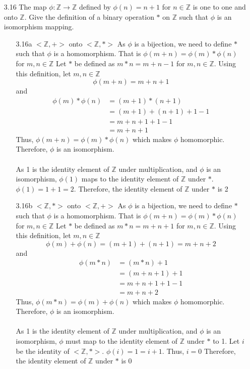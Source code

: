\documentclass[12pt]{article}
\newcommand{\Z}{\mathds{Z}}
\begin{document}
\begin{enumerate}
\begin{enumerate}
			\item[3.16] The map $\phi: \Z \rightarrow \Z$ defined by $\phi (n) = n+1$ for $n \in \Z$ is one to one and onto $\Z$. Give the definition of a binary operation $*$ on $\Z$ such that $\phi$ is an isomorphism mapping.
			\begin{enumerate}
				\item[3.16a]
				$<\Z,+>$ onto $<\Z,\ast>$
				As $ \phi $ is a bijection, we need to define $ * $ such that $ \phi $ is a homomorphism. That is $ \phi(m+n)=\phi(m)*\phi(n) $ for $ m,n \in\Z $
				Let $ * $ be defined as $ m*n = m+n-1$ for $ m,n\in\Z $. Using this definition, let $ m,n\in\Z $
					\[\phi(m + n)=m+n+1\] and
					\begin{align*}
						\phi(m)*\phi(n) &= (m+1)*(n+1)\\
										&= (m+1) + (n+1) + 1 - 1\\
										&= m + n + 1 + 1 -1\\
										&= m+n+1
					\end{align*}
					Thus, $ \phi(m+n)=\phi(m)*\phi(n) $ which makes $ \phi $ homomorphic.\\
					Therefore, $ \phi $ is an isomorphism.\\
					\\
					As 1 is the identity element of $\Z$  under multiplication, and $ \phi $ is an isomorphism, $ \phi(1) $ maps to the identity element of $ \Z $ under $ * $. $ \phi(1) = 1+1=2 $. Therefore, the identity element of $ \Z $ under $ * $ is 2
				\item[3.16b]
				$<\Z,\ast>$ onto $<\Z,+>$
					As $ \phi $ is a bijection, we need to define $ * $ such that $ \phi $ is a homomorphism. That is $ \phi(m+n)=\phi(m)*\phi(n) $ for $ m,n \in\Z $
					Let $ * $ be defined as $ m*n = m+n+1$ for $ m,n\in\Z $. Using this definition, let $ m,n\in\Z $
					\[\phi(m)+\phi(n)=(m+1)+(n+1)=m+n+2\] and
					\begin{align*}
						\phi(m * n) &= (m*n)+1\\
						&= (m+n+1)+1\\
						&= m + n + 1 + 1 -1\\
						&= m+n+2
					\end{align*}
					Thus, $ \phi(m*n)=\phi(m)+\phi(n) $ which makes $ \phi $ homomorphic.\\
					Therefore, $ \phi $ is an isomorphism.\\
					\\
					As 1 is the identity element of $\Z$  under multiplication, and $ \phi $ is an isomorphism, $ \phi $ must map to the identity element of $ \Z $ under $ * $ to 1. Let $i$ be the identity of $<\Z,*>$. $ \phi(i) = 1 = i +1 $. Thus, $i=0$ Therefore, the identity element of $ \Z $ under $ * $ is 0
			\end{enumerate}
			

\end{enumerate}
\end{enumerate}
\end{document}
